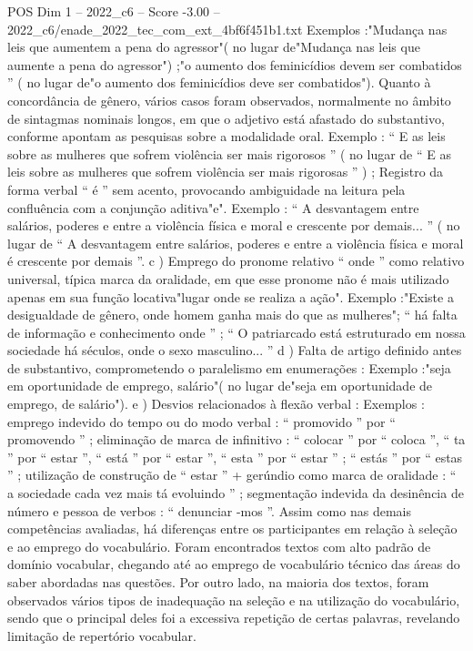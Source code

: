 \begin{textsample}{POS Dim 1 – 2022\_c6 – Score -3.00 – 2022\_c6/enade\_2022\_tec\_com\_ext\_4bf6f451b1.txt}
Exemplos :"Mudança nas leis que aumentem a pena do agressor"( no lugar de"Mudança nas leis que aumente a pena do agressor") ;"o aumento dos feminicídios devem ser combatidos ” ( no lugar de"o aumento dos feminicídios deve ser combatidos").
Quanto à concordância de gênero, vários casos foram observados, normalmente no âmbito de sintagmas nominais longos, em que o adjetivo está afastado do substantivo, conforme apontam as pesquisas sobre a modalidade oral.
Exemplo : “ E as leis sobre as mulheres que sofrem violência ser mais rigorosos ” ( no lugar de “ E as leis sobre as mulheres que sofrem violência ser mais rigorosas ” ) ; Registro da forma verbal “ é ” sem acento, provocando ambiguidade na leitura pela confluência com a conjunção aditiva"e".
Exemplo : “ A desvantagem entre salários, poderes e entre a violência física e moral e crescente por demais... ” ( no lugar de “ A desvantagem entre salários, poderes e entre a violência física e moral é crescente por demais ”. c ) Emprego do pronome relativo “ onde ” como relativo universal, típica marca da oralidade, em que esse pronome não é mais utilizado apenas em sua função locativa"lugar onde se realiza a ação".
Exemplo :"Existe a desigualdade de gênero, onde homem ganha mais do que as mulheres"; “ há falta de informação e conhecimento onde ” ; “ O patriarcado está estruturado em nossa sociedade há séculos, onde o sexo masculino... ” d ) Falta de artigo definido antes de substantivo, comprometendo o paralelismo em enumerações : Exemplo :"seja em oportunidade de emprego, salário"( no lugar de"seja em oportunidade de emprego, de salário"). e ) Desvios relacionados à flexão verbal : Exemplos : emprego indevido do tempo ou do modo verbal : “ promovido ” por “ promovendo ” ; eliminação de marca de infinitivo : “ colocar ” por “ coloca ”, “ ta ” por “ estar ”, “ está ” por “ estar ”, “ esta ” por “ estar ” ; “ estás ” por “ estas ” ; utilização de construção de “ estar ” + gerúndio como marca de oralidade : “ a sociedade cada vez mais tá evoluindo ” ; segmentação indevida da desinência de número e pessoa de verbos : “ denunciar -mos ”.
Assim como nas demais competências avaliadas, há diferenças entre os participantes em relação à seleção e ao emprego do vocabulário.
Foram encontrados textos com alto padrão de domínio vocabular, chegando até ao emprego de vocabulário técnico das áreas do saber abordadas nas questões.
Por outro lado, na maioria dos textos, foram observados vários tipos de inadequação na seleção e na utilização do vocabulário, sendo que o principal deles foi a excessiva repetição de certas palavras, revelando limitação de repertório vocabular.

\end{textsample}
